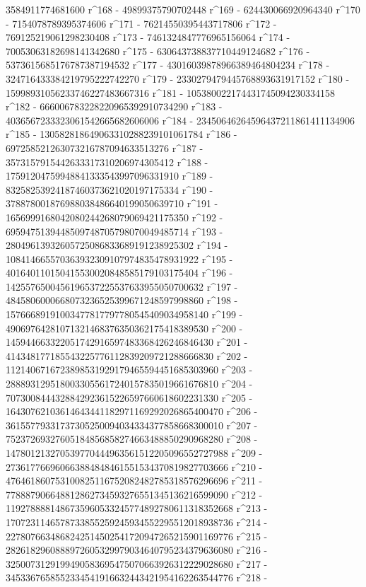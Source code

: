        3584911774681600 r^168 - 49899375790702448 r^169 - 
       624430066920964340 r^170 - 7154078789395374606 r^171 - 
       76214550395443717806 r^172 - 769125219061298230408 r^173 - 
       7461324847776965156064 r^174 - 70053063182698141342680 r^175 - 
       630643738837710449124682 r^176 - 
       5373615685176787387194532 r^177 - 
       43016039878966389464804234 r^178 - 
       324716433384219795222742270 r^179 - 
       2330279479445768893631917152 r^180 - 
       15998931056233746227483667316 r^181 - 
       105380022174431745094230334158 r^182 - 
       666006783228220965392910734290 r^183 - 
       4036567233323061542665682606006 r^184 - 
       23450646264596437211861411134906 r^185 - 
       130582818649063310288239101061784 r^186 - 
       697258521263073216787094633513276 r^187 - 
       3573157915442633317310206974305412 r^188 - 
       17591204759948841333543997096331910 r^189 - 
       83258253924187460373621020197175334 r^190 - 
       378878001876988038486640199050639710 r^191 - 
       1656999168042080244268079069421175350 r^192 - 
       6959475139448509748705798070049485714 r^193 - 
       28049613932605725086833689191238925302 r^194 - 
       108414665570363932309107974835478931922 r^195 - 
       401640110150415530020848585179103175404 r^196 - 
       1425576500456196537225537633955050700632 r^197 - 
       4845806000668073236525399671248597998860 r^198 - 
       15766689191003477817797780545409034958140 r^199 - 
       49069764281071321468376350362175418389530 r^200 - 
       145944663322051742916597483368426246846430 r^201 - 
       414348177185543225776112839209721288666830 r^202 - 
       1121406716723898531929179465594451685303960 r^203 - 
       2888931295180033055617240157835019661676810 r^204 - 
       7073008444328842923615226597660618602231330 r^205 - 
       16430762103614643441182971169292026865400470 r^206 - 
       36155779331737305250094034334377858668300010 r^207 - 
       75237269327605184856858274663488850290968280 r^208 - 
       147801213270539770444963561512205096552727988 r^209 - 
       273617766960663884848461551534370819827703666 r^210 - 
       476461860753100825116752082482785318576296696 r^211 - 
       778887906648812862734593276551345136216599090 r^212 - 
       1192788881486735960533245774892780611318352668 r^213 - 
       1707231146578733855259245934552295512018938736 r^214 - 
       2278076634868242514502541720947265215901169776 r^215 - 
       2826182960888972605329979034640795234379636080 r^216 - 
       3250073129199490583695475070663926312229028680 r^217 - 
       3453367658552334541916632443421954162263544776 r^218 - 

